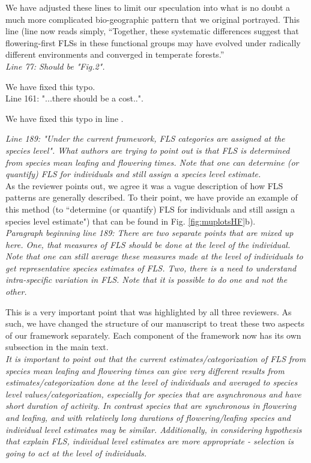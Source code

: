 \documentclass{article}[11pt]
\begin{document}
\noindent We have adjusted these lines to limit our speculation into what is no doubt a much more complicated bio-geographic pattern that we original portrayed. This line (line  now reads simply, ``Together, these systematic differences suggest that flowering-first FLSs in these functional groups may have evolved under radically different environments and converged in temperate forests.'' \\

\emph{Line 77: Should be "Fig.2".}

\noindent We have fixed this typo.\\

Line 161: "...there should be a cost..".

\noindent We have fixed this typo in line .

\emph{Line 189: "Under the current framework, FLS categories are assigned at the species level". What authors are trying to point out is that FLS is determined from species mean leafing and flowering times. Note that one can determine (or quantify) FLS for individuals and still assign a species level estimate.}\\

\noindent As the reviewer points out, we agree it was a vague description of how FLS patterns are generally described. To their point, we have provide an example of this method (to ``determine (or quantify) FLS for individuals and still assign a species level estimate") that can be found in Fig. \ref{fig:muplotsHF}b).\\


\emph{Paragraph beginning line 189: There are two separate points that are mixed up here. One, that measures of FLS should be done at the level of the individual. Note that one can still average these measures made at the level of individuals to get representative species estimates of FLS. Two, there is a need to understand intra-specific variation in FLS. Note that it is possible to do one and not the other.}
 
\noindent This is a very important point that was highlighted by all three reviewers. As such, we have changed the structure of our manuscript to treat these two aspects of our framework separately. Each component of the framework now has its own subsection in the main text.\\

\emph{It is important to point out that the current estimates/categorization of FLS from species mean leafing and flowering times can give very different results from estimates/categorization done at the level of individuals and averaged to species level values/categorization, especially for species that are asynchronous and have short duration of activity. In contrast species that are synchronous in flowering and leafing, and with relatively long durations of flowering/leafing species and individual level estimates may be similar. Additionally, in considering hypothesis that explain FLS, individual level estimates are more appropriate - selection is going to act at the level of individuals.}
\end{document}
